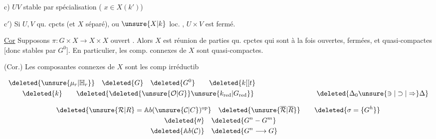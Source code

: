 c) $UV$ stable par spécialisation  (   $x\in X(k')$) 

c$'$) Si $U,V$ qu. cpcts (et $X$  séparé), ou $\unsure{X|k}$ loc. , $U\times V$ est fermé.

\uline{Cor} Supposons  $\pi:G\times X\longrightarrow X\times X$ ouvert . Alors $X$ est réunion de parties qu. cpctes  qui sont à la fois ouvertes, fermées, et quasi-compactes [donc stables par $G^0$]. En particulier, les comp. connexes de $X$ sont quasi-compactes.

(Cor.) Les composantes connexes de $X$ sont les comp irréductib

\[
\begin{aligned}
 &\deleted{\unsure{\mu_r|\mathbb{H}_r}}\quad \deleted{G}\quad \deleted{G^0}\qquad \deleted{k[[t}\\
 &\hspace{2em}\deleted{k}\qquad \deleted{\deleted{\unsure{\mathcal O|G}}\unsure{k_{\mathrm{red}}|G_{\mathrm{red}}}}
 \hspace{9em}\deleted{\Delta_0\unsure{\ni|\supset|\Rightarrow}\Delta}
\end{aligned}
\]

\[
\begin{aligned}
 \deleted{\unsure{\mathcal R|R}=\mathbb A b(\unsure{\mathcal C|C})^{\mathrm{op}}}
 &\quad\deleted{\unsure{\overline{\mathcal R}|\overline{R}}}
 \qquad\deleted{\sigma=\{G^{h}\}}\\
 \deleted{\prime\prime}\quad &\deleted{G^n-G^m}\\
 \deleted{\mathbb A b(\mathcal C)}\quad &\deleted{G^n\longrightarrow G}
\end{aligned}
\]


